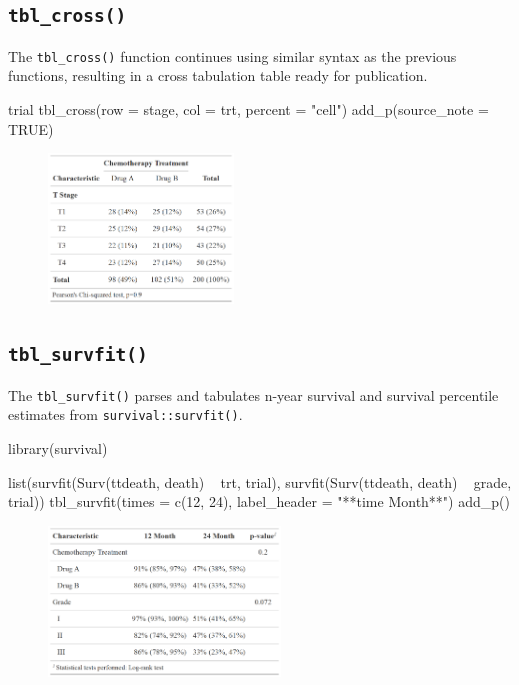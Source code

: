 \subsection{\texorpdfstring{\texttt{tbl\_cross()}}{tbl\_cross()}}

The \texttt{tbl\_cross()} function continues using similar syntax as the previous functions, resulting in a cross tabulation table ready for publication. 

\begin{example}
trial %
  tbl_cross(row = stage, col = trt, percent = "cell") %
  add_p(source_note = TRUE)
\end{example}
\begin{figure}[h!]
  \includegraphics[height=4cm]{cross.png}
  \centering
\end{figure}

\subsection{\texorpdfstring{\texttt{tbl\_survfit()}}{tbl\_survfit()}}

The \texttt{tbl\_survfit()} parses and tabulates n-year survival and survival percentile estimates from \texttt{survival::survfit()}.


\begin{example}
library(survival)

list(survfit(Surv(ttdeath, death) ~ trt, trial),
     survfit(Surv(ttdeath, death) ~ grade, trial)) %
  tbl_survfit(times = c(12, 24),
              label_header = "**{time} Month**") %
  add_p()
\end{example}

\begin{figure}[h!]
  \includegraphics[height=4cm]{survfit.png}
  \centering
\end{figure}

